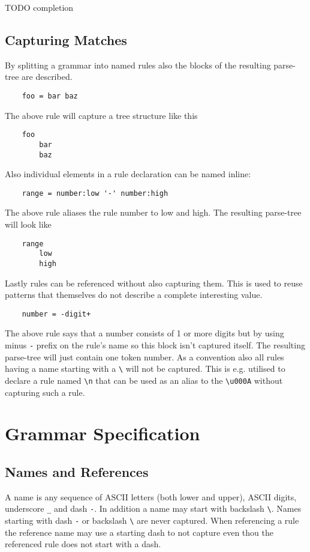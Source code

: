 \documentclass[10pt,a4paper]{article}
\begin{document}
TODO completion

\subsection{Capturing Matches}
By splitting a grammar into named rules also the blocks of the resulting parse-tree are described.
\begin{verbatim}
    foo = bar baz
\end{verbatim}
The above rule will capture a tree structure like this
\begin{verbatim}
    foo
        bar
        baz
\end{verbatim}

Also individual elements in a rule declaration can be named inline:
\begin{verbatim}
    range = number:low '-' number:high
\end{verbatim}    
    
The above rule aliases the rule number to low and high. The resulting parse-tree will look like
\begin{verbatim}
    range
        low
        high
\end{verbatim}

Lastly rules can be referenced without also capturing them. This is used to reuse patterns that themselves do not describe a complete interesting value.
\begin{verbatim}
    number = -digit+
\end{verbatim}
The above rule says that a number consists of 1 or more digits but by using minus \verb!-! prefix on the rule's name so this block isn't captured itself. The resulting parse-tree will just contain one token number. As a convention also all rules having a name starting with a \verb!\! will not be captured. This is e.g. utilised to declare a rule named \verb!\n! that can be used as an alias to the \verb!\u000A! without capturing such a rule.


\section{Grammar Specification}

\subsection{Names and References}
A name is any sequence of ASCII letters (both lower and upper), ASCII digits, underscore \verb$_$ and dash \verb$-$. In addition a name may start with backslash \verb$\$. Names starting with dash \verb$-$ or backslash \verb$\$ are never captured. When referencing a rule the reference name may use a starting dash to not capture even thou the referenced rule does not start with a dash.
\end{document}
